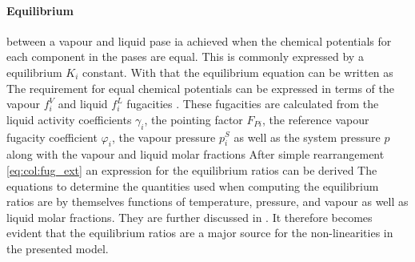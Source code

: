         \paragraph{Equilibrium} between a vapour and liquid pase ia achieved when the chemical potentials for each
        component in the pases are equal. This is commonly expressed by a equilibrium $K_i$ constant. With
        that the equilibrium equation can be written as
        The requirement for equal chemical potentials can be expressed in terms of the vapour $f_i^V$
        and liquid $f_i^L$ fugacities \cite{AndreasPfennig.2003}.
        These fugacities are calculated from the liquid activity coefficients $\gamma_i$,
        the pointing factor $F_{Pi}$, the reference vapour fugacity coefficient $\varphi_i$,
        the vapour pressure $p^S_i$ as well as the system pressure $p$ along with the vapour and
        liquid molar fractions
        After simple rearrangement \eqref{eq:col:fug_ext} an expression for the equilibrium ratios
        can be derived
        The equations to determine the quantities used when computing the equilibrium ratios are by
        themselves functions of temperature, pressure, and vapour as well as liquid molar fractions.
        They are further discussed in . It therefore becomes evident that the
        equilibrium ratios are a major source for the non-linearities in the presented model.


